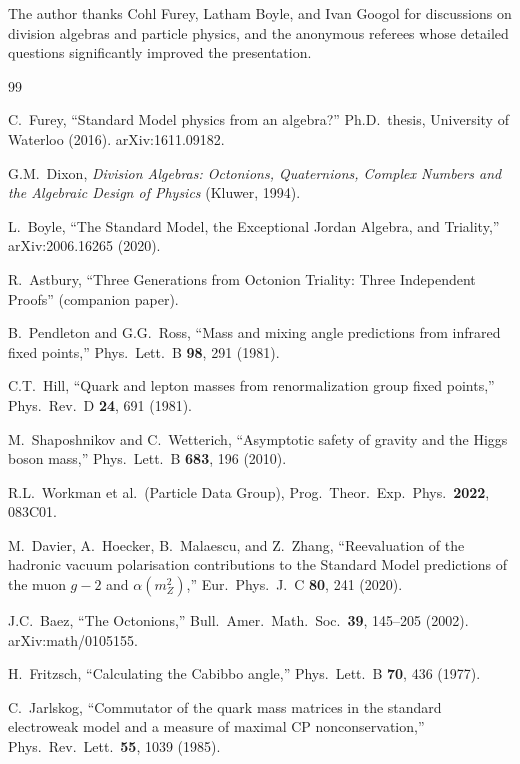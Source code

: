 \documentclass[12pt,a4paper]{article}
\theoremstyle{definition}
\theoremstyle{remark}
\begin{document}
The author thanks Cohl Furey, Latham Boyle, and Ivan Googol for discussions 
on division algebras and particle physics, and the anonymous referees whose 
detailed questions significantly improved the presentation.

\begin{thebibliography}{99}

C.~Furey, ``Standard Model physics from an algebra?''
Ph.D.\ thesis, University of Waterloo (2016). arXiv:1611.09182.

G.M.~Dixon, \emph{Division Algebras: Octonions, Quaternions, Complex Numbers 
and the Algebraic Design of Physics} (Kluwer, 1994).

L.~Boyle, ``The Standard Model, the Exceptional Jordan Algebra, and Triality,''
arXiv:2006.16265 (2020).

R.~Astbury, ``Three Generations from Octonion Triality: 
Three Independent Proofs'' (companion paper).

B.~Pendleton and G.G.~Ross, ``Mass and mixing angle predictions from 
infrared fixed points,'' Phys.\ Lett.\ B \textbf{98}, 291 (1981).

C.T.~Hill, ``Quark and lepton masses from renormalization group fixed points,''
Phys.\ Rev.\ D \textbf{24}, 691 (1981).

M.~Shaposhnikov and C.~Wetterich, ``Asymptotic safety of gravity and the 
Higgs boson mass,'' Phys.\ Lett.\ B \textbf{683}, 196 (2010).

R.L.~Workman et al.\ (Particle Data Group), 
Prog.\ Theor.\ Exp.\ Phys.\ \textbf{2022}, 083C01.

M.~Davier, A.~Hoecker, B.~Malaescu, and Z.~Zhang,
``Reevaluation of the hadronic vacuum polarisation contributions to the 
Standard Model predictions of the muon $g-2$ and $\alpha(m_Z^2)$,''
Eur.\ Phys.\ J.\ C \textbf{80}, 241 (2020).

J.C.~Baez, ``The Octonions,'' Bull.\ Amer.\ Math.\ Soc.\ \textbf{39}, 
145--205 (2002). arXiv:math/0105155.

H.~Fritzsch, ``Calculating the Cabibbo angle,'' 
Phys.\ Lett.\ B \textbf{70}, 436 (1977).

C.~Jarlskog, ``Commutator of the quark mass matrices in the standard 
electroweak model and a measure of maximal CP nonconservation,''
Phys.\ Rev.\ Lett.\ \textbf{55}, 1039 (1985).


\end{thebibliography}
\end{document}
